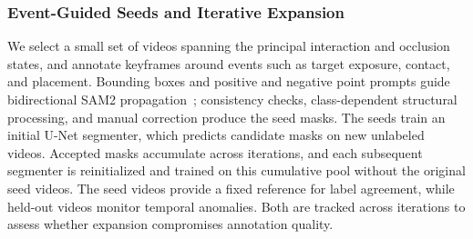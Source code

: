 \subsubsection{Event-Guided Seeds and Iterative Expansion}
We select a small set of videos spanning the principal interaction and occlusion states, and annotate keyframes around events such as target exposure, contact, and placement.
Bounding boxes and positive and negative point prompts guide bidirectional SAM2 propagation~\cite{ravi2024sam2}; consistency checks, class-dependent structural processing, and manual correction produce the seed masks.
The seeds train an initial U-Net segmenter, which predicts candidate masks on new unlabeled videos.
Accepted masks accumulate across iterations, and each subsequent segmenter is reinitialized and trained on this cumulative pool without the original seed videos.
The seed videos provide a fixed reference for label agreement, while held-out videos monitor temporal anomalies.
Both are tracked across iterations to assess whether expansion compromises annotation quality.

